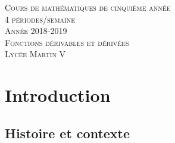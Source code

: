 \documentclass[a4paper,fontsize=13pt]{scrreprt}
\theoremstyle{plain}
\theoremstyle{definition}
\begin{document}
	
\begin{titlepage}
	
	\newcommand{\HRule}{\rule{\linewidth}{0.4mm}} %
	
	\center %
	
	
	\vspace{4cm}
	
	\textsc{\Large Cours de mathématiques de cinquième année \\ 4 périodes/semaine \\ Année 2018-2019}\\[0.3cm]
	\vspace{9.4cm}
	\textsc{\LARGE Fonctions dérivables et dérivées}\\[0.6cm] %
	\vspace{9.8cm}
	\textsc{\Large Lycée Martin V}\\[0.3cm] %
	

	
\end{titlepage}
	

\tableofcontents



\chapter{Introduction}

\section{Histoire et contexte} \label{Histoire et contexte}
\end{document}
